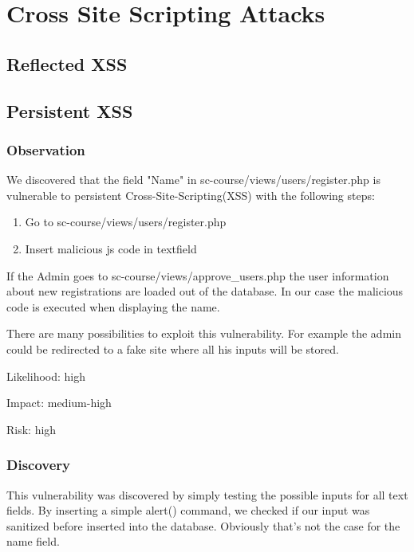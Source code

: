 \chapter{Cross Site Scripting Attacks}

\section{Reflected XSS}

\section{Persistent XSS}

\subsection{Observation}

We discovered that the field "Name" in sc-course/views/users/register.php is vulnerable to persistent Cross-Site-Scripting(XSS) with the following steps:
\begin{enumerate}
 \item Go to sc-course/views/users/register.php
 \item Insert malicious js code in textfield
\end{enumerate}
 If the Admin goes to sc-course/views/approve\_users.php the user information about new registrations are  loaded out of the database. In our case the malicious code is executed when displaying the name.

There are many possibilities to exploit this vulnerability. For example the admin could be redirected to a fake site where all his inputs will be stored.\newline


Likelihood: high \newline

Impact: medium-high\newline

Risk: high\newline

\subsection{Discovery}

This vulnerability was discovered by simply testing the possible inputs for all text fields. By inserting a simple alert() command, we checked if our input was sanitized before inserted into the database. Obviously that's not the case for the name field.

